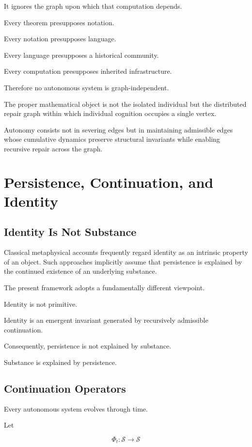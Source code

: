 \documentclass[11pt,oneside]{book}
\numberwithin{equation}{chapter}
\theoremstyle{definition}
\theoremstyle{plain}
\begin{document}
It ignores the graph upon which that computation depends.

Every theorem presupposes notation.

Every notation presupposes language.

Every language presupposes a historical community.

Every computation presupposes inherited infrastructure.

Therefore no autonomous system is graph-independent.

The proper mathematical object is not the isolated individual but the
distributed repair graph within which individual cognition occupies a single
vertex.

Autonomy consists not in severing edges but in maintaining admissible edges
whose cumulative dynamics preserve structural invariants while enabling
recursive repair across the graph.

\chapter{Persistence, Continuation, and Identity}

\section{Identity Is Not Substance}

Classical metaphysical accounts frequently regard identity as an intrinsic
property of an object. Such approaches implicitly assume that persistence is
explained by the continued existence of an underlying substance.

The present framework adopts a fundamentally different viewpoint.

Identity is not primitive.

Identity is an emergent invariant generated by recursively admissible
continuation.

Consequently, persistence is not explained by substance.

Substance is explained by persistence.

\section{Continuation Operators}

Every autonomous system evolves through time.

Let

\[
\Phi_t:\mathcal{S}\rightarrow\mathcal{S}
\]
\end{document}
